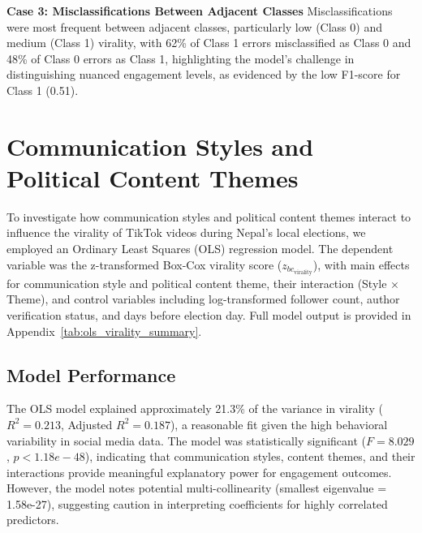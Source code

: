 \documentclass[12pt,a4paper]{report}
\begin{document}
\textbf{Case 3: Misclassifications Between Adjacent Classes}
Misclassifications were most frequent between adjacent classes, particularly low (Class 0) and medium (Class 1) virality, with 62\% of Class 1 errors misclassified as Class 0 and 48\% of Class 0 errors as Class 1, highlighting the model’s challenge in distinguishing nuanced engagement levels, as evidenced by the low F1-score for Class 1 (0.51).
\newpage
\section{Communication Styles and Political Content Themes}
To investigate how communication styles and political content themes interact to influence the virality of TikTok videos during Nepal’s local elections, we employed an Ordinary Least Squares (OLS) regression model. The dependent variable was the z-transformed Box-Cox virality score (\( z_{bc_{\text{virality}}} \)), with main effects for communication style and political content theme, their interaction (Style \(\times\) Theme), and control variables including log-transformed follower count, author verification status, and days before election day. Full model output is provided in Appendix~\ref{tab:ols_virality_summary}.

\subsection{Model Performance}
The OLS model explained approximately 21.3\% of the variance in virality (\( R^2 = 0.213 \), Adjusted \( R^2 = 0.187 \)), a reasonable fit given the high behavioral variability in social media data. The model was statistically significant (\( F = 8.029 \), \( p < 1.18e - 48 \)), indicating that communication styles, content themes, and their interactions provide meaningful explanatory power for engagement outcomes. However, the model notes potential multi-collinearity (smallest eigenvalue = 1.58e-27), suggesting caution in interpreting coefficients for highly correlated predictors. 
\end{document}
